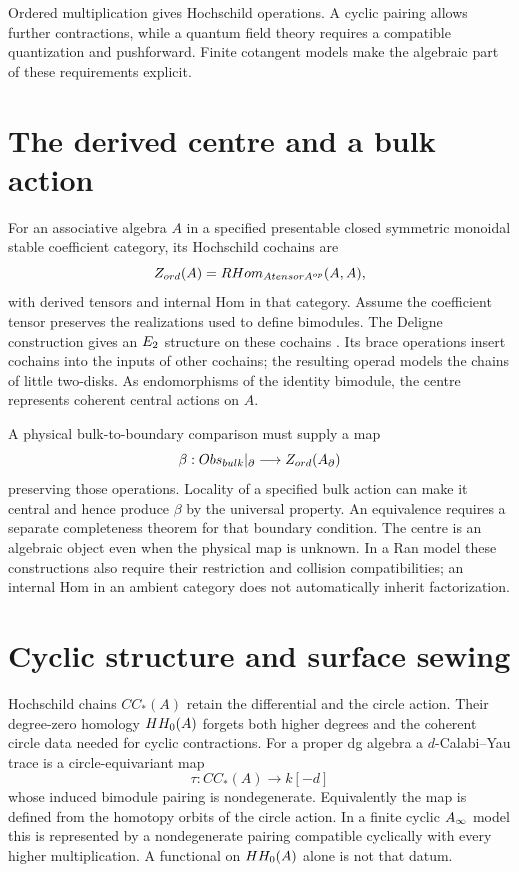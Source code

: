 Ordered multiplication gives Hochschild operations.
A cyclic pairing allows further contractions, while a quantum field theory
requires a compatible quantization and pushforward. Finite cotangent models
make the algebraic part of these requirements explicit.

\section{The derived centre and a bulk action}
For an associative algebra $A$ in a specified presentable closed symmetric monoidal stable
coefficient category, its Hochschild cochains are
\[
 Z_{ord}(A)=RHom_{Atensor A^{op}}(A,A),
\]
with derived tensors and internal Hom in that category.
Assume the coefficient tensor preserves the realizations used to define bimodules.
The Deligne construction gives an $E_2$ structure on these cochains
\cite{McClureSmith,KontsevichSoibelmanDeligne}.
Its brace operations insert cochains into the inputs of other cochains;
the resulting operad models the chains of little two-disks.
As endomorphisms of the identity bimodule, the centre represents coherent
central actions on $A$.

A physical bulk-to-boundary comparison must supply a map
\[
 \beta:Obs_{bulk}|_{\partial}\longrightarrow Z_{ord}(A_{\partial})
\]
preserving those operations. Locality of a specified bulk action can make it
central and hence produce $\beta$ by the universal property.
An equivalence requires a separate completeness theorem for that boundary
condition. The centre is an algebraic object even when the physical map is unknown.
In a Ran model these constructions also require their restriction and collision
compatibilities; an internal Hom in an ambient category does not automatically
inherit factorization.

\section{Cyclic structure and surface sewing}
Hochschild chains $CC_*(A)$ retain the differential and the circle action.
Their degree-zero homology $HH_0(A)$ forgets both higher degrees and the
coherent circle data needed for cyclic contractions.
For a proper dg algebra a $d$-Calabi--Yau trace is a circle-equivariant map
\[
 \tau:CC_*(A)\longrightarrow k[-d]
\]
whose induced bimodule pairing is nondegenerate.
Equivalently the map is defined from the homotopy orbits of the circle action.
In a finite cyclic $A_\infty$ model this is represented by a nondegenerate pairing
compatible cyclically with every higher multiplication.
A functional on $HH_0(A)$ alone is not that datum.

